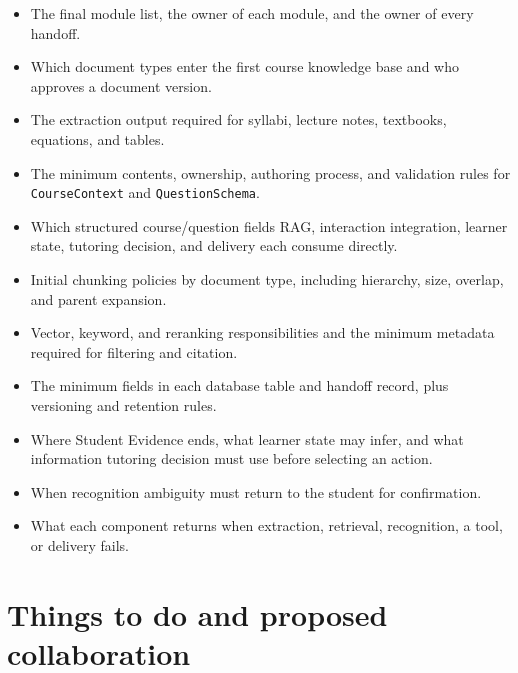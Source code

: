 \documentclass[11pt]{article}
\begin{document}
\begin{itemize}
    \item The final module list, the owner of each module, and the owner of every handoff.
    \item Which document types enter the first course knowledge base and who approves a document version.
    \item The extraction output required for syllabi, lecture notes, textbooks, equations, and tables.
    \item The minimum contents, ownership, authoring process, and validation rules for \texttt{CourseContext} and \texttt{QuestionSchema}.
    \item Which structured course/question fields RAG, interaction integration, learner state, tutoring decision, and delivery each consume directly.
    \item Initial chunking policies by document type, including hierarchy, size, overlap, and parent expansion.
    \item Vector, keyword, and reranking responsibilities and the minimum metadata required for filtering and citation.
    \item The minimum fields in each database table and handoff record, plus versioning and retention rules.
    \item Where Student Evidence ends, what learner state may infer, and what information tutoring decision must use before selecting an action.
    \item When recognition ambiguity must return to the student for confirmation.
    \item What each component returns when extraction, retrieval, recognition, a tool, or delivery fails.
\end{itemize}

\section{Things to do and proposed collaboration}
\end{document}
